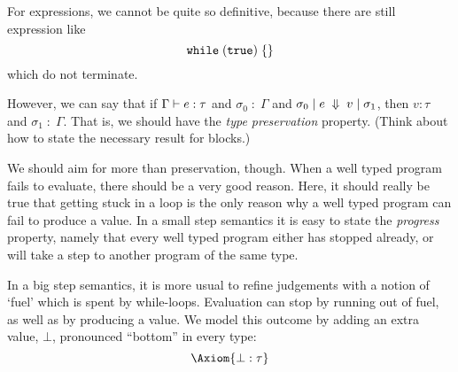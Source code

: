 \documentclass{article}
\begin{document}
For expressions, we cannot be quite so definitive, because there are still
expression like
\[
  \mathtt{while}\; \mathtt{(}\mathtt{true}\mathtt{)} \;\{\}
\]
which do not terminate.

However, we can say that if $\Gamma \vdash e : \tau$ and $\sigma_0\;:\;\Gamma$
and $\sigma_0 \;|\; e \;\Downarrow\; v \;|\; \sigma_1$, then $v : \tau$ and $\sigma_1\;:\;\Gamma$.
That is, we should have the \emph{type preservation} property. (Think about
how to state the necessary result for blocks.)

We should aim for more than preservation, though. When a well typed program fails to evaluate, there should be a very good reason. Here, it should really be true
that getting stuck in a loop is the only reason why a well typed program can fail to produce a value. In a small step semantics it is easy to state the \emph{progress} property, namely that every well typed program either has stopped already, or will take a step to another program of the same type.

In a big step
semantics, it is more usual to refine judgements with a notion of
`fuel' which is spent by while-loops. Evaluation can stop by running
out of fuel, as well as by producing a value. We model this outcome
by adding an extra value, $\bot$, pronounced ``bottom'' in every type:
\[
  \Axiom{\bot : \tau}
  \]
\end{document}
